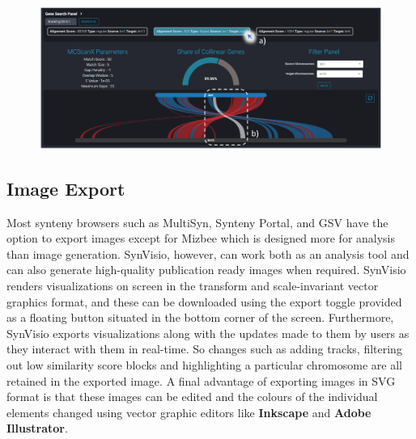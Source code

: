 \begin{figure}
  \centering
  \includegraphics[width=1\linewidth]{images/ch_5_gene_serach.PNG}
  \label{fig:ch_5_gene_serach}
\end{figure}


\subsection{Image Export}
Most synteny browsers such as MultiSyn, Synteny Portal, and GSV\cite{baek2016multisyn,lee2016syntenyportal,revanna2011gsv} have the option to export images except for Mizbee\cite{Meyer2009} which is designed more for analysis than image generation.
SynVisio, however, can work both as an analysis tool and can also generate high-quality publication ready images when required. SynVisio renders visualizations on screen in the transform and scale-invariant vector graphics format, and these can be downloaded using the export toggle provided as a floating button situated in the bottom corner of the screen. Furthermore, SynVisio exports visualizations along with the updates made to them by users as they interact with them in real-time. So changes such as adding tracks, filtering out low similarity score blocks and highlighting a particular chromosome are all retained in the exported image. A final advantage of exporting images in SVG format is that these images can be edited and the colours of the individual elements changed using vector graphic editors like \textbf{Inkscape} and \textbf{Adobe Illustrator}.

